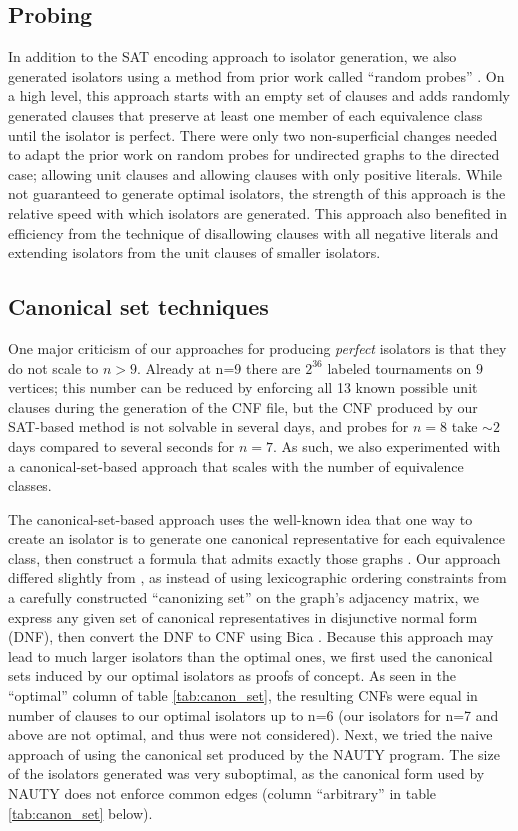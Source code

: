 \documentclass[conference]{IEEEtran}
\begin{document}
\subsection{Probing}
In addition to the SAT encoding approach to isolator generation, we also generated isolators using a method from prior work called ``random probes''  \cite{ref_heule}. On a high level, this approach starts with an empty set of clauses and adds randomly generated clauses that preserve at least one member of each equivalence class until the isolator is perfect.  There were only two non-superficial changes needed to adapt the prior work on random probes for undirected graphs to the directed case; allowing unit clauses and allowing clauses with only positive literals. While not guaranteed to generate optimal isolators, the strength of this approach is the relative speed with which isolators are generated. This approach also benefited in efficiency from the technique of disallowing clauses with all negative literals and extending isolators from the unit clauses of smaller isolators.

\subsection{Canonical set techniques}
One major criticism of our approaches for producing \textit{perfect} isolators is that they do not scale to $n>9$. Already at n=9 there are $2^{36}$ labeled tournaments on $9$ vertices; this number can be reduced by enforcing all 13 known possible unit clauses during the generation of the CNF file, but the CNF produced by our SAT-based method is not solvable in several days, and probes for $n=8$ take $\sim 2$ days compared to several seconds for $n=7$. As such, we also experimented with a canonical-set-based approach that scales with the number of equivalence classes. 

The canonical-set-based approach uses the well-known idea that one way to create an isolator is to generate one canonical representative for each equivalence class, then construct a formula that admits exactly those graphs \cite{ref_canon_set}. Our approach differed slightly from \cite{ref_canon_set}, as instead of using lexicographic ordering constraints from a carefully constructed ``canonizing set'' on the graph's adjacency matrix, we express any given set of canonical representatives in disjunctive normal form (DNF), then convert the DNF to CNF using Bica \cite{ref_bica}. Because this approach may lead to much larger isolators than the optimal ones, we first used the canonical sets induced by our optimal isolators as proofs of concept. As seen in the ``optimal'' column of  table \ref{tab:canon_set}, the resulting CNFs were equal in number of clauses to our optimal isolators up to n=6 (our isolators for n=7 and above are not optimal, and thus were not considered). Next, we tried the naive approach of using the canonical set produced by the NAUTY \cite{ref_nauty} program. The size of the isolators generated was very suboptimal, as the canonical form used by NAUTY does not enforce common edges (column ``arbitrary'' in table \ref{tab:canon_set} below).
\end{document}
